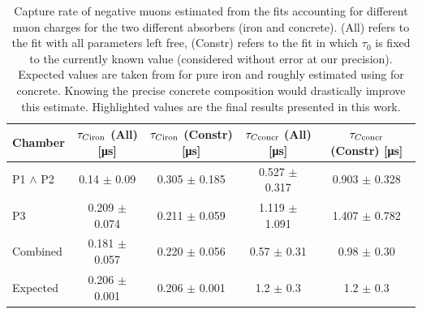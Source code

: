 \documentclass[../main.tex]{subfiles}
\begin{document}
\begin{table}[htb!]
    \caption{Capture rate of negative muons estimated from the fits accounting for different muon charges for the two different absorbers (iron and concrete). (All) refers to the fit with all parameters left free, (Constr) refers to the fit in which $\tau_0$ is fixed to the currently known value (considered without error at our precision). Expected values are taken from \cite{suzuki1987total} for pure iron and roughly estimated using \cite{nayel2018characterisation, suzuki1987total} for concrete. Knowing the precise concrete composition would drastically improve this estimate. Highlighted values are the final results presented in this work.}
    \label{tab:tauCResults}
    \centering
        \begin{tabular}{|l|cc|cc|}
        \hline
        Chamber & $\tau_{C\textnormal{iron}}$ (All) [\si{\micro \second}] & $\tau_{C\textnormal{iron}}$ (Constr) [\si{\micro \second}] & $\tau_{C\textnormal{concr}}$ (All) [\si{\micro \second}] & $\tau_{C\textnormal{concr}}$ (Constr) [\si{\micro \second}] \\ \hline
        P1 $\land$ P2 & 0.14\phantom{0} $\pm$ 0.09\phantom{0}   & 0.305 $\pm$ 0.185 & 0.527 $\pm$ 0.317 & 0.903 $\pm$ 0.328  \\
        P3         & 0.209 $\pm$ 0.074 & 0.211 $\pm$ 0.059 & 1.119 $\pm$ 1.091   & 1.407 $\pm$ 0.782    \\ \hline
        Combined   & 0.181 $\pm$ 0.057 & \cellcolor[HTML]{67FD9A}0.220 $\pm$ 0.056 & 0.57\phantom{0}  $\pm$ 0.31\phantom{0}  & \cellcolor[HTML]{67FD9A}0.98\phantom{0}  $\pm$ 0.30\phantom{0}  \\
        Expected   & 0.206 $\pm$ 0.001 & 0.206 $\pm$ 0.001 & 1.2\phantom{00} $\pm$ 0.3\phantom{00}             & 1.2\phantom{00} $\pm$ 0.3\phantom{00}                  \\ \hline
        \end{tabular}
\end{table}
\end{document}
